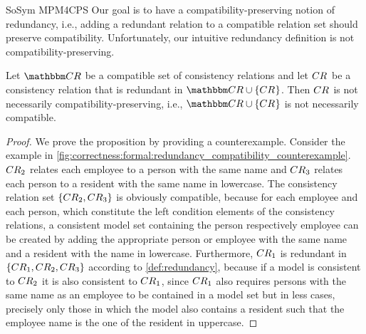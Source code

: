 \begin{copiedFrom}{SoSym MPM4CPS}
Our goal is to have a compatibility-preserving notion of redundancy, i.e., adding a redundant relation to a compatible relation set should preserve compatibility.
Unfortunately, our intuitive redundancy definition is not compatibility-preserving. %

\begin{proposition} \label{prop:redundantnotimpliescompatible}
    Let $\consistencyrelationset{CR}$ be a compatible set of consistency relations and let $CR_{}$ be a consistency relation that is redundant in $\consistencyrelationset{CR} \cup \setted{\consistencyrelation{CR}{}}$.
    Then $CR_{}$ is not necessarily compatibility-preserving, i.e., $\consistencyrelationset{CR} \cup \setted{\consistencyrelation{CR}{}}$ is not necessarily compatible.
\end{proposition}

\begin{proof}
We prove the proposition by providing a counterexample. %
Consider the example in \autoref{fig:correctness:formal:redundancy_compatibility_counterexample}. 
$CR_{2}$ relates each employee to a person with the same name and $CR_{3}$ relates each person to a resident with the same name in lowercase.
The consistency relation set $\{ CR_{2}, CR_{3} \}$ is obviously compatible, because for each employee and each person, which constitute the left condition elements of the consistency relations, a consistent model set containing the person respectively employee can be created by adding the appropriate person or employee with the same name and a resident with the name in lowercase.
Furthermore, $CR_{1}$ is redundant in $\{ CR_{1}, CR_{2}, CR_{3} \}$ according to \autoref{def:redundancy}, because if a model is consistent to $CR_{2}$ it is also consistent to $CR_{1}$, since $CR_{1}$ also requires persons with the same name as an employee to be contained in a model set but in less cases, precisely only those in which the model also contains a resident such that the employee name is the one of the resident in uppercase.


\end{proof}
\end{copiedFrom}
